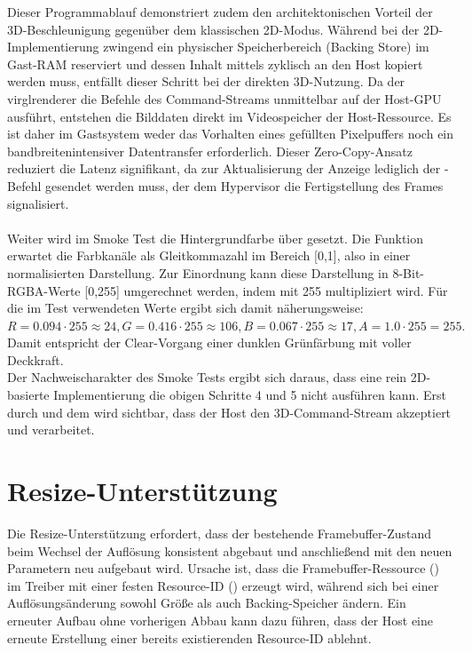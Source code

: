 Dieser Programmablauf demonstriert zudem den architektonischen Vorteil der 3D-Beschle\-unigung gegenüber dem klassischen 2D-Modus. Während bei der 2D-Implementierung zwingend ein physischer Speicherbereich (Backing Store) im Gast-RAM reserviert und dessen Inhalt mittels  zyklisch an den Host kopiert werden muss, entfällt dieser Schritt bei der direkten 3D-Nutzung. Da der virglrenderer die Befehle des Command-Streams unmittelbar auf der Host-GPU ausführt, entstehen die Bilddaten direkt im Videospeicher der Host-Ressource. Es ist daher im Gastsystem weder das Vorhalten eines gefüllten Pixelpuffers noch ein bandbreitenintensiver Datentransfer erforderlich. Dieser Zero-Copy-Ansatz reduziert die Latenz signifikant, da zur Aktualisierung der Anzeige lediglich der -Befehl gesendet werden muss, der dem Hypervisor die Fertigstellung des Frames signalisiert.\\
\\
Weiter wird im Smoke Test die Hintergrundfarbe über  gesetzt. Die Funktion erwartet die Farbkanäle als Gleitkommazahl im Bereich [0,1], also in einer normalisierten Darstellung. Zur Einordnung kann diese Darstellung in 8-Bit-RGBA-Werte [0,255] umgerechnet werden, indem mit 255 multipliziert wird. Für die im Test verwendeten Werte ergibt sich damit näherungsweise: $R = 0.094 \cdot 255 \approx 24, G = 0.416 \cdot 255 \approx 106, B = 0.067 \cdot 255 \approx 17, A = 1.0 \cdot 255 = 255.$ Damit entspricht der Clear-Vorgang einer dunklen Grünfärbung mit voller Deckkraft.\\ Der Nachweischarakter des Smoke Tests ergibt sich daraus, dass eine rein 2D-basierte Implementierung die obigen Schritte 4 und 5 nicht ausführen kann. Erst durch  und dem  wird sichtbar, dass der Host den 3D-Command-Stream akzeptiert und verarbeitet.


\section{Resize-Unterstützung}

Die Resize-Unterstützung erfordert, dass der bestehende Framebuffer-Zustand beim Wechsel der Auflösung konsistent abgebaut und anschließend mit den neuen Parametern neu aufgebaut wird. Ursache ist, dass die Framebuffer-Ressource () im Treiber mit einer festen Resource-ID () erzeugt wird, während sich bei einer Auflösungsänderung sowohl Größe als auch Backing-Speicher ändern. Ein erneuter Aufbau ohne vorherigen Abbau kann dazu führen, dass der Host eine erneute Erstellung einer bereits existierenden Resource-ID ablehnt.

